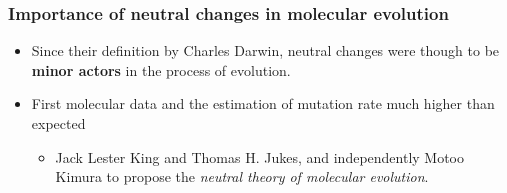 \documentclass[hyperref={pagebackref=true},table]{beamer}
\begin{document}
\begin{frame}
  \frametitle{Importance of neutral changes in molecular evolution}

  \begin{itemize}
  \item <1-> Since their definition by Charles Darwin, neutral changes were though to be \textbf{minor actors} in the process of evolution.
  \item <2-> First molecular data and the estimation of mutation rate much higher than expected
    \begin{itemize}
    \item <3> Jack Lester King and Thomas H. Jukes, and independently Motoo Kimura to propose the \textit{neutral theory of molecular evolution}.
    \end{itemize}
  \end{itemize}
\end{frame}
\end{document}
